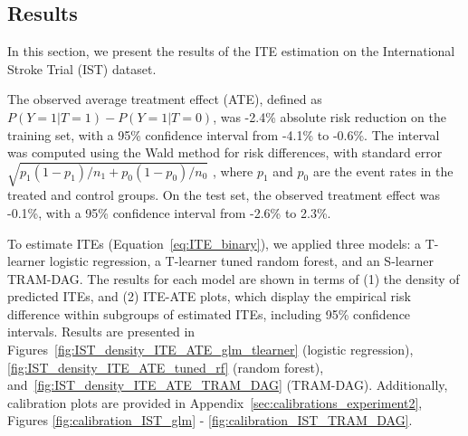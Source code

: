 



\subsection{Results} \label{sec:results_experiment2}


In this section, we present the results of the ITE estimation on the International Stroke Trial (IST) dataset. 

The observed average treatment effect (ATE), defined as $P(Y=1|T=1) - P(Y=1|T=0)$, was -2.4\% absolute risk reduction on the training set, with a 95\% confidence interval from -4.1\% to -0.6\%. The interval was computed using the Wald method for risk differences, with standard error $\sqrt{p_1 (1 - p_1)/n_1 + p_0 (1 - p_0)/n_0}$
, where $p_1$ and $p_0$ are the event rates in the treated and control groups. On the test set, the observed treatment effect was -0.1\%, with a 95\% confidence interval from -2.6\% to 2.3\%. 

To estimate ITEs (Equation~\ref{eq:ITE_binary}), we applied three models: a T-learner logistic regression, a T-learner tuned random forest, and an S-learner TRAM-DAG. The results for each model are shown in terms of (1) the density of predicted ITEs, and (2) ITE-ATE plots, which display the empirical risk difference within subgroups of estimated ITEs, including 95\% confidence intervals. Results are presented in Figures~\ref{fig:IST_density_ITE_ATE_glm_tlearner} (logistic regression), \ref{fig:IST_density_ITE_ATE_tuned_rf} (random forest), and~\ref{fig:IST_density_ITE_ATE_TRAM_DAG} (TRAM-DAG). Additionally, calibration plots are provided in Appendix~\ref{sec:calibrations_experiment2}, Figures \ref{fig:calibration_IST_glm} - \ref{fig:calibration_IST_TRAM_DAG}. 


